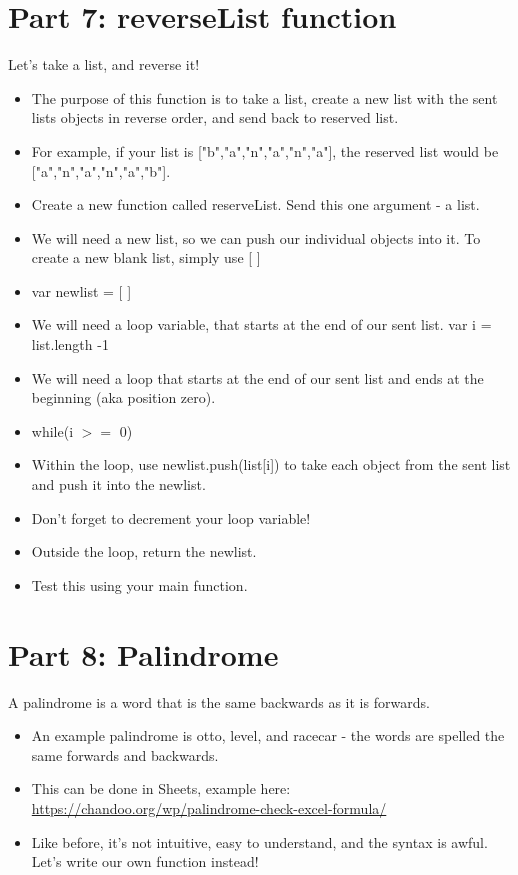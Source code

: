 \documentclass{article}
\begin{document}
\section*{Part 7: reverseList function}
Let's take a list, and reverse it!
\begin{itemize}
    \item The purpose of this function is to take a list, create a new list with the sent lists objects in reverse order, and send back to reserved list.
    \item For example, if your list is ["b","a","n","a","n","a"], the reserved list would be ["a","n","a","n","a","b"].
    \item Create a new function called reserveList.  Send this one argument - a list.
	\item We will need a new list, so we can push our individual objects into it.  To create a new blank list, simply use [ ]
	\item var newlist = [ ]
	\item We will need a loop variable, that starts at the end of our sent list.  var i = list.length -1
	\item We will need a loop that starts at the end of our sent list and ends at the beginning (aka position zero).
	\item while(i $>=$ 0)
	\item Within the loop, use newlist.push(list[i]) to take each object from the sent list and push it into the newlist.
	\item Don't forget to decrement your loop variable!
	\item Outside the loop, return the newlist.
	\item Test this using your main function.
\end{itemize}

\section*{Part 8: Palindrome}
A palindrome is a word that is the same backwards as it is forwards.  
\begin{itemize}
	\item An example palindrome is otto, level, and racecar - the words are spelled the same forwards and backwards.
	\item This can be done in Sheets, example here:  \url{https://chandoo.org/wp/palindrome-check-excel-formula/}
	\item Like before, it's not intuitive, easy to understand, and the syntax is awful.  Let's write our own function instead!
\end{itemize}
\end{document}
